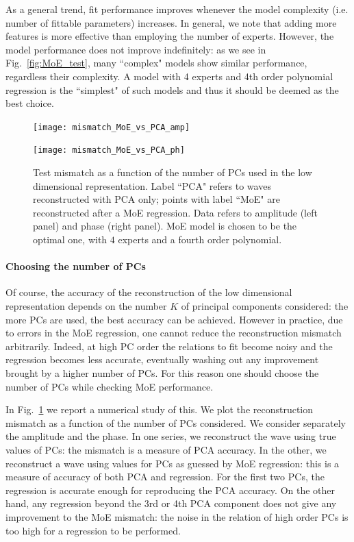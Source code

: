 As a general trend, fit performance improves whenever the model complexity (i.e. number of fittable parameters) increases.
In general, we note that adding more features is more effective than employing the number of experts.
However, the model performance does not improve indefinitely: as we see in Fig.~\ref{fig:MoE_test}, many ``complex" models show similar performance, regardless their complexity.
A model with 4 experts and 4th order polynomial regression is the ``simplest" of such models and thus it should be deemed as the best choice.
\begin{figure}[!t]
	\centering 
    \begin{minipage}{.5\linewidth}
		\centering
	    \texttt{[image: mismatch\_MoE\_vs\_PCA\_amp]}
	\end{minipage}\hfill
    \begin{minipage}{.5\linewidth}
		\centering
	    \texttt{[image: mismatch\_MoE\_vs\_PCA\_ph]}
	\end{minipage}
	\caption{Test mismatch as a function of the number of PCs used in the low dimensional representation.
Label ``PCA" refers to waves reconstructed with PCA only; points with label ``MoE" are reconstructed after a MoE regression.
Data refers to amplitude (left panel) and phase (right panel).
MoE model is chosen to be the optimal one, with $4$ experts and a fourth order polynomial.
}
	\label{fig:mismatch_MoE_vs_PCA}
\end{figure}
\paragraph{Choosing the number of PCs}
Of course, the accuracy of the reconstruction of the low dimensional representation depends on the number $K$ of principal components considered: the more PCs are used, the best accuracy can be achieved.
However in practice, due to errors in the MoE regression, one cannot reduce the reconstruction mismatch
arbitrarily. Indeed, at high PC order the relations to fit become noisy and the regression becomes less accurate, eventually washing out any improvement brought by a higher number of PCs.
For this reason one should choose the number of PCs while checking MoE performance.

In Fig.~\ref{fig:mismatch_MoE_vs_PCA} we report a numerical study of this. We plot the reconstruction mismatch as a function of the number of PCs considered. We consider separately the amplitude and the phase. In one series, we reconstruct the wave using true values of PCs: the mismatch is a measure of PCA accuracy. In the other, we reconstruct a wave using values for PCs as guessed by MoE regression: this is a measure of accuracy of both PCA and regression.
For the first two PCs, the regression is accurate enough for reproducing the PCA accuracy.
On the other hand, any regression beyond the 3rd or 4th PCA component does not give any improvement to the MoE mismatch: the noise in the relation of high order PCs is too high for a regression to be performed.

